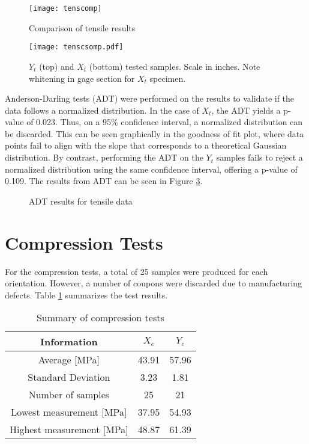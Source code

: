 \documentclass[main.tex]{subfiles}
\begin{document}
\begin{figure}[h]
	\center
	\texttt{[image: tenscomp]}
	\caption{Comparison of tensile results} \label{fig:tensComp}
\end{figure}

\begin{figure}[!htbp]
	\center
	\texttt{[image: tenscsomp.pdf]}
	\captionsetup{justification=centering} %
	\caption[$X_t$ and $Y_t$ tested samples]{$Y_t$ (top) and $X_t$ (bottom) tested samples. Scale in inches. Note whitening in gage section for $X_t$ specimen.} \label{fig:tensSComp}
\end{figure}

Anderson-Darling tests (ADT) were performed on the results to validate if the data follows a normalized distribution. In the case of $X_t$, the ADT yields a p-value of 0.023. Thus, on a 95\% confidence interval, a normalized distribution can be discarded. This can be seen graphically in the goodness of fit plot, where data points fail to align with the slope that corresponds to a theoretical Gaussian distribution. By contrast, performing the ADT on the $Y_t$ samples fails to reject a normalized distribution using the same confidence interval, offering a p-value of 0.109. %
The results from ADT can be seen in Figure \ref{fig:adttens}.

\begin{figure}[!htbp]
	\center
	\hfill
	\caption{ADT results for tensile data} \label{fig:adttens}
\end{figure}

\pagebreak
      
\section{Compression Tests} \label{sec:compr}
For the compression tests, a total of 25 samples were produced for each orientation. However, a number of coupons were discarded due to manufacturing defects. Table \ref{tab:comprtab} summarizes the test results.  

\begin{table} [h]
	\centering
	\caption{Summary of compression tests}%
	\begin{tabular}{ c| c c } 
		\toprule
		\textbf{Information} & $X_c$ & $Y_c$\\
		\midrule
		Average [MPa] &43.91  & 57.96\\
		Standard Deviation &3.23  & 1.81\\
		Number of samples &25  & 21\\
		Lowest measurement [MPa] &37.95 &54.93 \\
		Highest measurement [MPa] &48.87 &61.39 \\
		\bottomrule
	\end{tabular}
\label{tab:comprtab}
\end{table}
\end{document}
